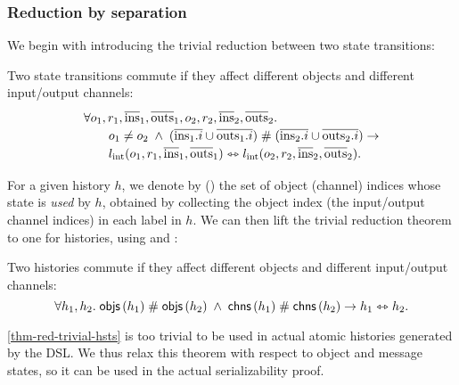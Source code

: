 \subsubsection{Reduction by separation}

We begin with introducing the trivial reduction between two state transitions:
\begin{theorem}
  \label{thm-red-trivial-steps}
  Two state transitions commute if they affect different objects and different input/output channels:
  \begin{displaymath}
    \renewcommand{\arraystretch}{1.2}
    \begin{array}{l}
      \forall o_1, r_1, \listof{\mathrm{ins}}_1, \listof{\mathrm{outs}}_1,
      o_2, r_2, \listof{\mathrm{ins}}_2, \listof{\mathrm{outs}}_2.\\
      \quad\quad o_1 \neq o_2 \;\wedge\; \listdisj{(\listof{\idxOf{\mathrm{ins}_1}} \cup \listof{\idxOf{\mathrm{outs}_1}})}{(\listof{\idxOf{\mathrm{ins}_2}} \cup \listof{\idxOf{\mathrm{outs}_2}})} \to\\
      \quad\quad \commstep{\lblInt{o_1}{r_1}{\listof{\mathrm{ins}}_1}{\listof{\mathrm{outs}}_1}}
                 {\lblInt{o_2}{r_2}{\listof{\mathrm{ins}}_2}{\listof{\mathrm{outs}}_2}}.
    \end{array}
  \end{displaymath}
\end{theorem}

For a given history $h$, we denote by  () the set of object (channel) indices whose state is \emph{used} by $h$, obtained by collecting the object index (the input/output channel indices) in each label in $h$.
We can then lift the trivial reduction theorem to one for histories, using  and :
\begin{theorem}
  \label{thm-red-trivial-hsts}
  Two histories commute if they affect different objects and different input/output channels:
  \begin{displaymath}
    \forall h_1, h_2.\; \mathsf{objs}\,(h_1) \; \# \; \mathsf{objs}\,(h_2) \;\wedge\; \mathsf{chns}\,(h_1) \; \# \; \mathsf{chns}\,(h_2) \to h_1 \leftrightarrowtriangle h_2.
  \end{displaymath}
\end{theorem}

\autoref{thm-red-trivial-hsts} is too trivial to be used in actual atomic histories generated by the \hemiola{} DSL.
We thus relax this theorem with respect to object and message states, so it can be used in the actual serializability proof.

